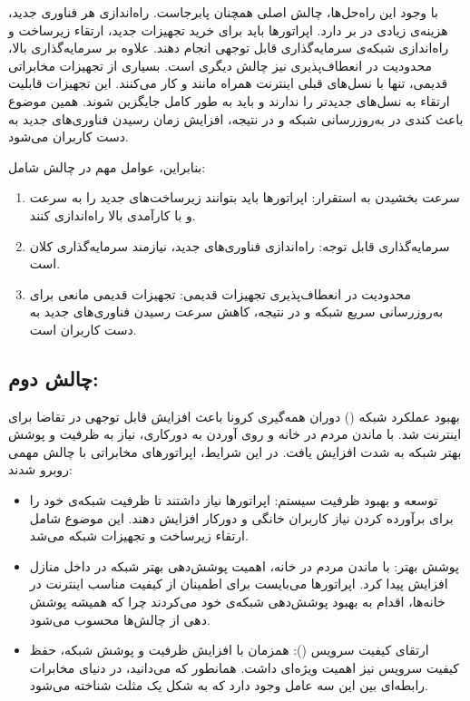 \documentclass[landscape, 12pt]{report}
\begin{document}
با وجود این راه‌حل‌ها، چالش اصلی همچنان پابرجاست. راه‌اندازی هر فناوری جدید، هزینه‌ی زیادی در بر دارد. اپراتورها باید برای خرید تجهیزات جدید، ارتقاء زیرساخت و راه‌اندازی شبکه‌ی 
 سرمایه‌گذاری قابل توجهی انجام دهند.
علاوه بر سرمایه‌گذاری بالا، محدودیت در انعطاف‌پذیری نیز چالش دیگری است. بسیاری از تجهیزات مخابراتی قدیمی، تنها با نسل‌های قبلی اینترنت همراه مانند 
 و
   کار می‌کنند. این تجهیزات قابلیت ارتقاء به نسل‌های جدیدتر را ندارند و باید به طور کامل جایگزین شوند. همین موضوع باعث کندی در به‌روزرسانی شبکه و در نتیجه، افزایش زمان رسیدن فناوری‌های جدید به دست کاربران می‌شود.

بنابراین، عوامل مهم در چالش  شامل:
\begin{enumerate}
\item سرعت بخشیدن به استقرار: اپراتورها باید بتوانند زیرساخت‌های جدید را به سرعت و با کارآمدی بالا راه‌اندازی کنند.
\item سرمایه‌گذاری قابل توجه: راه‌اندازی فناوری‌های جدید، نیازمند سرمایه‌گذاری کلان است.
\item محدودیت در انعطاف‌پذیری تجهیزات قدیمی: تجهیزات قدیمی مانعی برای به‌روزرسانی سریع شبکه و در نتیجه، کاهش سرعت رسیدن فناوری‌های جدید به دست کاربران است.
\end{enumerate}
\subsection*{چالش دوم:}
 بهبود عملکرد شبکه () 
دوران همه‌گیری کرونا باعث افزایش قابل توجهی در تقاضا برای اینترنت شد. با ماندن مردم در خانه و روی آوردن به دورکاری، نیاز به ظرفیت و پوشش بهتر شبکه به شدت افزایش یافت. در این شرایط، اپراتورهای مخابراتی با چالش مهمی روبرو شدند:
\begin{itemize}
\item توسعه و بهبود ظرفیت سیستم: اپراتورها نیاز داشتند تا ظرفیت شبکه‌ی خود را برای برآورده کردن نیاز کاربران خانگی و دورکار افزایش دهند. این موضوع شامل ارتقاء زیرساخت و تجهیزات شبکه می‌شد.
\item پوشش بهتر: با ماندن مردم در خانه، اهمیت پوشش‌دهی بهتر شبکه در داخل منازل افزایش پیدا کرد. اپراتورها می‌بایست برای اطمینان از کیفیت مناسب اینترنت در خانه‌ها، اقدام به بهبود پوشش‌دهی شبکه‌ی خود می‌کردند چرا که همیشه پوشش دهی  از چالش‌ها محسوب می‌شود.
\item ارتقای کیفیت سرویس (): همزمان با افزایش ظرفیت و پوشش شبکه، حفظ کیفیت سرویس نیز اهمیت ویژه‌ای داشت. همانطور که می‌دانید، در دنیای مخابرات رابطه‌ای بین این سه عامل وجود دارد که به شکل یک مثلث شناخته می‌شود.
\end{itemize}
\end{document}
